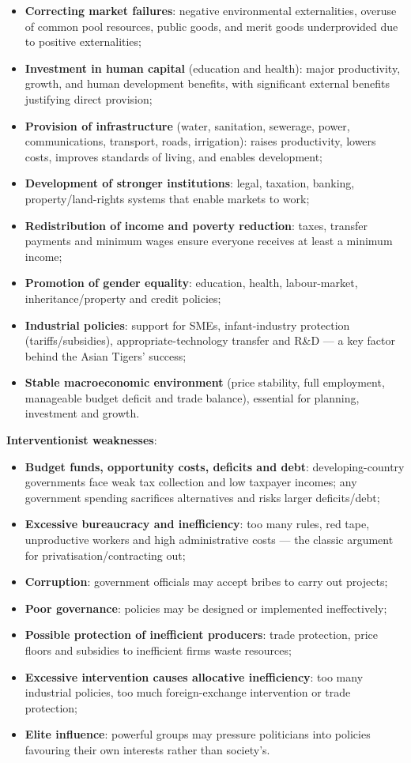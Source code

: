 \documentclass[a4paper,12pt]{article}
\begin{document}
\begin{itemize}
  \item \textbf{Correcting market failures}: negative environmental externalities, overuse of common pool resources, public goods, and merit goods underprovided due to positive externalities;
  \item \textbf{Investment in human capital} (education and health): major productivity, growth, and human development benefits, with significant external benefits justifying direct provision;
  \item \textbf{Provision of infrastructure} (water, sanitation, sewerage, power, communications, transport, roads, irrigation): raises productivity, lowers costs, improves standards of living, and enables development;
  \item \textbf{Development of stronger institutions}: legal, taxation, banking, property/land-rights systems that enable markets to work;
  \item \textbf{Redistribution of income and poverty reduction}: taxes, transfer payments and minimum wages ensure everyone receives at least a minimum income;
  \item \textbf{Promotion of gender equality}: education, health, labour-market, inheritance/property and credit policies;
  \item \textbf{Industrial policies}: support for SMEs, infant-industry protection (tariffs/subsidies), appropriate-technology transfer and R\&D --- a key factor behind the Asian Tigers' success;
  \item \textbf{Stable macroeconomic environment} (price stability, full employment, manageable budget deficit and trade balance), essential for planning, investment and growth.
\end{itemize}
\textbf{Interventionist weaknesses}:
\begin{itemize}
  \item \textbf{Budget funds, opportunity costs, deficits and debt}: developing-country governments face weak tax collection and low taxpayer incomes; any government spending sacrifices alternatives and risks larger deficits/debt;
  \item \textbf{Excessive bureaucracy and inefficiency}: too many rules, red tape, unproductive workers and high administrative costs --- the classic argument for privatisation/contracting out;
  \item \textbf{Corruption}: government officials may accept bribes to carry out projects;
  \item \textbf{Poor governance}: policies may be designed or implemented ineffectively;
  \item \textbf{Possible protection of inefficient producers}: trade protection, price floors and subsidies to inefficient firms waste resources;
  \item \textbf{Excessive intervention causes allocative inefficiency}: too many industrial policies, too much foreign-exchange intervention or trade protection;
  \item \textbf{Elite influence}: powerful groups may pressure politicians into policies favouring their own interests rather than society's.
\end{itemize}
\end{document}
